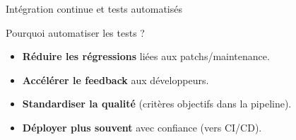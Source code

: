 \documentclass[aspectratio=169,10pt]{beamer}
\begin{document}
\begin{frame}{Intégration continue et tests automatisés}

      \begin{alertblock}{Pourquoi automatiser les tests ?}
        \begin{itemize}
          \item \textbf{Réduire les régressions} liées aux patchs/maintenance.
          \item \textbf{Accélérer le feedback} aux développeurs.
          \item \textbf{Standardiser la qualité} (critères objectifs dans la pipeline).
          \item \textbf{Déployer plus souvent} avec confiance (vers CI/CD).
        \end{itemize}
      \end{alertblock}

\end{frame}
\end{document}
